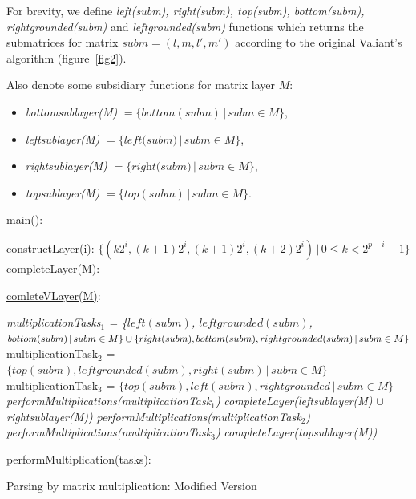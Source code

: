 For brevity, we define \textit{left(subm), right(subm), top(subm), bottom(subm), rightgrounded(subm)} and \textit{leftgrounded(subm)} functions which returns the submatrices for matrix $subm = (l, m, l', m')$ according to the original Valiant's algorithm (figure~\ref{fig2}).

Also denote some subsidiary functions for matrix layer $M$:
 \begin{itemize}
  \item \textit{bottomsublayer(M)} $ = \{bottom(subm)\, |\,subm \in M \}$,
  \item \textit{leftsublayer(M)} $ = \{\textit{left(subm)}\, |\,subm \in M \}$,
  \item \textit{rightsublayer(M)} $ =\{\textit{right(subm)}\, |\,subm \in M \}$,
  \item \textit{topsublayer(M)} $ = \{top(subm)\, |\,subm \in M \}$.
\end{itemize}

\begin{algorithm}[h!]
\SetAlgoNoLine
{}
\underline{main()}{:}{

 \BlankLine
 }

\underline{constructLayer(i)}{:}{
 \BlankLine
 $\{(k2^i, (k+1)2^i, (k + 1)2^i, (k+2)2^i) \, |\, 0 \le k < 2^{p - i} - 1\}$
 \BlankLine
    }
\underline{completeLayer(M)}{:}{
\BlankLine
{}
\BlankLine
}

\underline{comleteVLayer(M)}{:}{
 \BlankLine
 \textit{multiplicationTasks$_1$ = \linebreak 
    \{$left(subm)$, $leftgrounded(subm)$, $bottom(subm)\, |\,subm \in M \} \cup \linebreak  \{right(subm), bottom(subm), rightgrounded(subm)\, |\,subm \in M\}$\;}
 \BlankLine
 multiplicationTask$_2$ = $\{top(subm), leftgrounded(subm), right(subm)\, |\,subm \in M\}$\;
 \BlankLine
 multiplicationTask$_3$ = $\{top(subm), left(subm), rightgrounded\, |\,subm \in M\}$\;
 \BlankLine
 \textit{performMultiplications(multiplicationTask$_1$)}\;
 \textit{completeLayer(leftsublayer(M) $\cup$ rightsublayer(M))}\;
 \textit{performMultiplications(multiplicationTask$_2$)}\;
 \textit{performMultiplications(multiplicationTask$_3$)}\;
 \textit{completeLayer(topsublayer(M))}

 }
 \BlankLine

 \underline{performMultiplication(tasks)}{:}{\\
 }

\caption{Parsing by matrix multiplication: Modified Version}
\label{algo:modified}
\end{algorithm}


